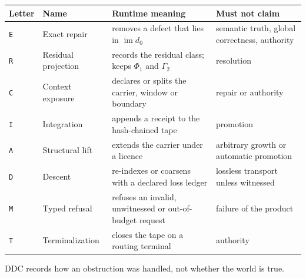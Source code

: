 \documentclass[
  11pt,
]{article}
\newenvironment{Shaded}{}{}
\newcommand{\NormalTok}[1]{#1}
\renewcommand{\_}{\ddcunderscore\allowbreak}
\begin{document}
\begin{longtable}[]{@{}
  >{\raggedright\arraybackslash}p{}
  >{\raggedright\arraybackslash}p{}
  >{\raggedright\arraybackslash}p{}
  >{\raggedright\arraybackslash}p{}@{}}
\toprule\noalign{}
\begin{minipage}[b]{\linewidth}\raggedright
Letter
\end{minipage} & \begin{minipage}[b]{\linewidth}\raggedright
Name
\end{minipage} & \begin{minipage}[b]{\linewidth}\raggedright
Runtime meaning
\end{minipage} & \begin{minipage}[b]{\linewidth}\raggedright
Must not claim
\end{minipage} \\
\midrule\noalign{}
\endhead
\bottomrule\noalign{}
\endlastfoot
\texttt{E} & Exact repair & removes a defect that lies in
\(\operatorname{im} d_0\) & semantic truth, global correctness,
authority \\
\texttt{R} & Residual projection & records the residual class; keeps
\(\Phi_1\) and \(\Gamma_2\) & resolution \\
\texttt{C} & Context exposure & declares or splits the carrier, window
or boundary & repair or authority \\
\texttt{I} & Integration & appends a receipt to the hash-chained tape &
promotion \\
\texttt{Λ} & Structural lift & extends the carrier under a licence &
arbitrary growth or automatic promotion \\
\texttt{D} & Descent & re-indexes or coarsens with a declared loss
ledger & lossless transport unless witnessed \\
\texttt{M} & Typed refusal & refuses an invalid, unwitnessed or
out-of-budget request & failure of the product \\
\texttt{T} & Terminalization & closes the tape on a routing terminal &
authority \\
\end{longtable}

\begin{Shaded}
\begin{Highlighting}[]
\NormalTok{DDC records how an obstruction was handled, not whether the world is true.}
\end{Highlighting}
\end{Shaded}
\end{document}
